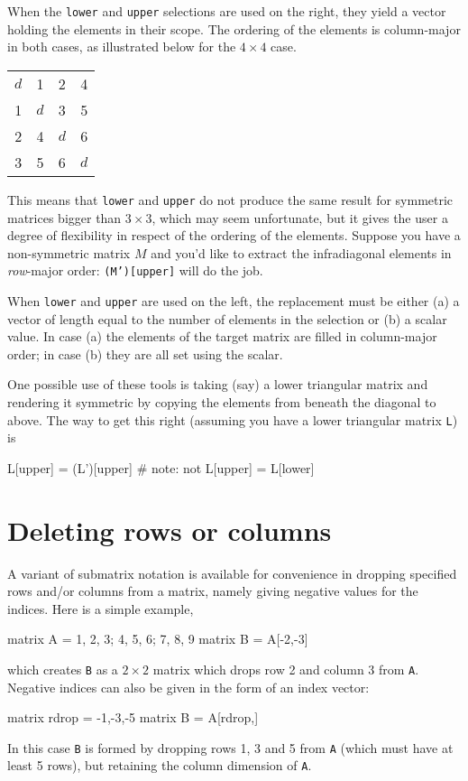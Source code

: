 When the \texttt{lower} and \texttt{upper} selections are used on the
right, they yield a vector holding the elements in their scope. The
ordering of the elements is column-major in both cases, as illustrated
below for the $4 \times 4$ case.
\begin{center}
  \begin{tabular}{cccc}
    $d$ & 1 & 2 & 4 \\
    1 & $d$ & 3 & 5 \\
    2 & 4 & $d$ & 6 \\
    3 & 5 & 6 & $d$
  \end{tabular}
\end{center}
This means that \texttt{lower} and \texttt{upper} do not produce the
same result for symmetric matrices bigger than $3 \times 3$, which may
seem unfortunate, but it gives the user a degree of flexibility in
respect of the ordering of the elements. Suppose you have a
non-symmetric matrix $M$ and you'd like to extract the infradiagonal
elements in \textit{row}-major order: \texttt{(M')[upper]} will do the
job.

When \texttt{lower} and \texttt{upper} are used on the left, the
replacement must be either (a) a vector of length equal to the number
of elements in the selection or (b) a scalar value. In case (a) the
elements of the target matrix are filled in column-major order; in
case (b) they are all set using the scalar.

One possible use of these tools is taking (say) a lower triangular
matrix and rendering it symmetric by copying the elements from beneath
the diagonal to above. The way to get this right (assuming you have a
lower triangular matrix \texttt{L}) is
\begin{code}
L[upper] = (L')[upper]  # note: not L[upper] = L[lower]
\end{code}

\section{Deleting rows or columns}
\label{sec:neg-indices}

A variant of submatrix notation is available for convenience in
dropping specified rows and/or columns from a matrix, namely giving
negative values for the indices. Here is a simple example,
%
\begin{code}
matrix A = {1, 2, 3; 4, 5, 6; 7, 8, 9}
matrix B = A[-2,-3]
\end{code}
%
which creates \texttt{B} as a $2\times 2$ matrix which drops row 2 and
column 3 from \texttt{A}. Negative indices can also be given in the
form of an index vector:
%
\begin{code}
matrix rdrop = {-1,-3,-5}
matrix B = A[rdrop,]
\end{code}
%
In this case \texttt{B} is formed by dropping rows 1, 3 and 5 from
\texttt{A} (which must have at least 5 rows), but retaining the column
dimension of \texttt{A}.

